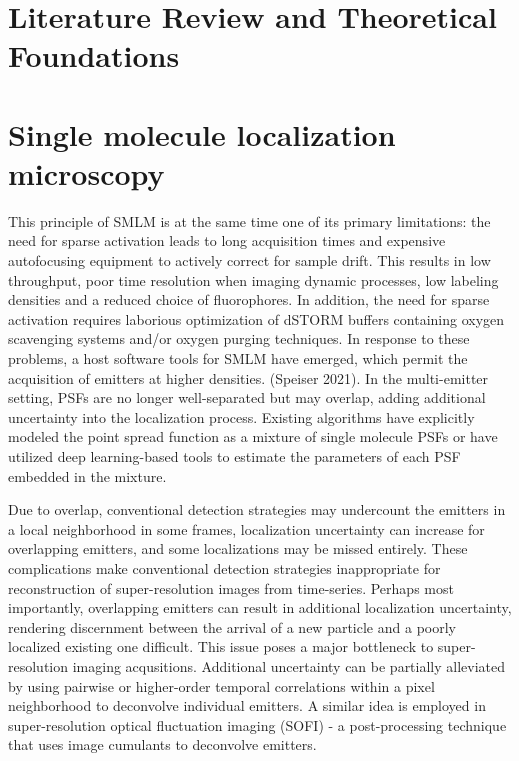 \documentclass{ucetd}
\begin{document}
\clearpage

\mainmatter

\chapter{Literature Review and Theoretical Foundations}

\chapter{Single molecule localization microscopy}


This principle of SMLM is at the same time one of its primary limitations: the need for sparse activation leads to long acquisition times and expensive autofocusing equipment to actively correct for sample drift. This results in low throughput, poor time resolution when imaging dynamic processes, low labeling densities and a reduced choice of fluorophores. In addition, the need for sparse activation requires laborious optimization of dSTORM buffers containing oxygen scavenging systems and/or oxygen purging techniques. In response to these problems, a host software tools for SMLM have emerged, which permit the acquisition of emitters at higher densities. (Speiser 2021). In the multi-emitter setting, PSFs are no longer well-separated but may overlap, adding additional uncertainty into the localization process. Existing algorithms have explicitly modeled the point spread function as a mixture of single molecule PSFs or have utilized deep learning-based tools to estimate the parameters of each PSF embedded in the mixture.  

Due to overlap, conventional detection strategies may undercount the emitters in a local neighborhood in some frames, localization uncertainty can increase for overlapping emitters, and some localizations may be missed entirely. These complications make conventional detection strategies inappropriate for reconstruction of super-resolution images from time-series. Perhaps most importantly, overlapping emitters can result in additional localization uncertainty, rendering discernment between the arrival of a new particle and a poorly localized existing one difficult. This issue poses a major bottleneck to super-resolution imaging acqusitions. Additional uncertainty can be partially alleviated by using pairwise or higher-order temporal correlations within a pixel neighborhood to deconvolve individual emitters. A similar idea is employed in super-resolution optical fluctuation imaging (SOFI) - a post-processing technique that uses image cumulants to deconvolve emitters. 
\end{document}

